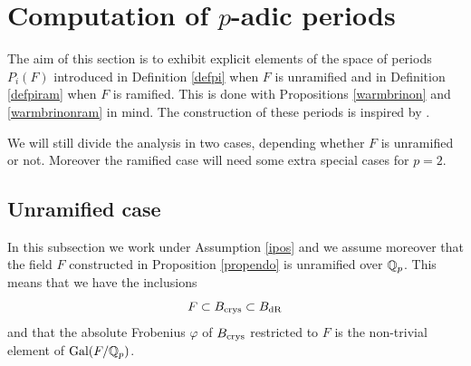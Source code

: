 \documentclass[11pt]{amsart}
\begin{document}
\section{Computation of $p$-adic periods}\label{computation}
The aim of this section is to exhibit explicit elements of the space of periods $P_i(F)$ introduced in Definition \ref{defpi} when $F$ is unramified and in Definition \ref{defpiram} when $F$ is ramified. This is done with Propositions  \ref{warmbrinon} and \ref{warmbrinonram} in mind. The construction of these periods is inspired by \cite[\S 9]{Colmez}.


 We will still divide the analysis in two cases, depending  whether $F$ is unramified or not.  Moreover the ramified case will need some extra special cases for $p=2$.

 \subsection*{Unramified case}

In  this subsection we work under   Assumption  \ref{ipos} and we assume moreover that the field $F$  constructed in  Proposition \ref{propendo} is unramified over $\mathbb{Q}_p$.
This means that we have the inclusions \[F \subset  B_{\textnormal{crys}} \subset B_{\mathrm{dR}}\] and that the absolute Frobenius $\varphi$ of $B_{\textnormal{crys}}$  restricted to $F$ is the  non-trivial element of $\textnormal{Gal}(F/\mathbb{Q}_p)$.
\end{document}
